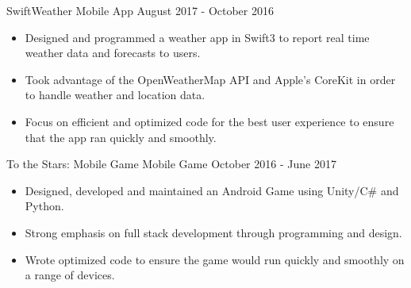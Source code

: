 \documentclass[10pt,a4paper]{altacv}
\begin{document}
\divider

\cvproject
	{SwiftWeather}
    {Mobile App}
    {August 2017 - October 2016}
\begin{itemize}
	\item {Designed and programmed a weather app in Swift3 to report real time weather data and forecasts to users.}
    \item {Took advantage of the OpenWeatherMap API and Apple's CoreKit in order to handle weather and location data.}
    \item {Focus on efficient and optimized code for the best user experience to ensure that the app ran quickly and smoothly.}
\end{itemize}

\divider

\cvproject
	{To the Stars: Mobile Game}
    {Mobile Game}
    {October 2016 - June 2017}
\begin{itemize}
	\item {Designed, developed and maintained an Android Game using Unity/C\# and Python.}
    \item {Strong emphasis on full stack development through programming and design.}
    \item {Wrote optimized code to ensure the game would run quickly and smoothly on a range of devices.}
\end{itemize}

\divider


\end{document}
